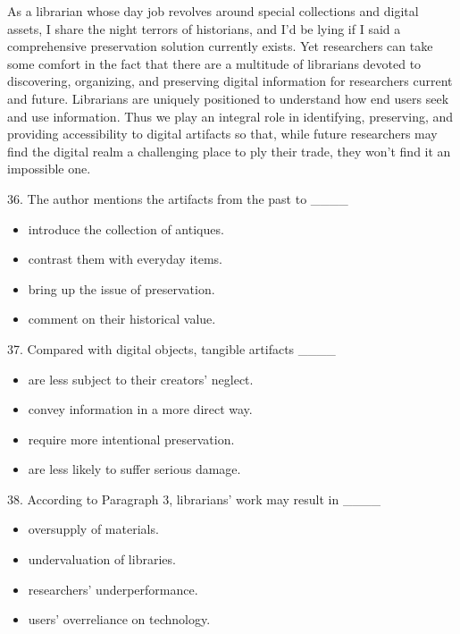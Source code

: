 \documentclass[UTF8,11pt]{ctexart}
\begin{document}
As a librarian whose day job revolves around special collections and digital assets, I share the night terrors of historians, and I’d be lying if I said a comprehensive preservation solution currently exists. Yet researchers can take some comfort in the fact that there are a multitude of librarians devoted to discovering, organizing, and preserving digital information for researchers current and future. Librarians are uniquely positioned to understand how end users seek and use information. Thus we play an integral role in identifying, preserving, and providing accessibility to digital artifacts so that, while future researchers may find the digital realm a challenging place to ply their trade, they won’t find it an impossible one.


36. The author mentions the artifacts from the past to \_\_\_\_


\begin{itemize}[leftmargin=2em,itemsep=.2em,topsep=.4em]\item[A.] introduce the collection of antiques.
\item[B.] contrast them with everyday items.
\item[C.] bring up the issue of preservation.
\item[D.] comment on their historical value.
\end{itemize}

37. Compared with digital objects, tangible artifacts \_\_\_\_


\begin{itemize}[leftmargin=2em,itemsep=.2em,topsep=.4em]\item[A.] are less subject to their creators’ neglect.
\item[B.] convey information in a more direct way.
\item[C.] require more intentional preservation.
\item[D.] are less likely to suffer serious damage.
\end{itemize}

38. According to Paragraph 3, librarians’ work may result in \_\_\_\_


\begin{itemize}[leftmargin=2em,itemsep=.2em,topsep=.4em]\item[A.] oversupply of materials.
\item[B.] undervaluation of libraries.
\item[C.] researchers’ underperformance.
\item[D.] users’ overreliance on technology.
\end{itemize}
\end{document}
